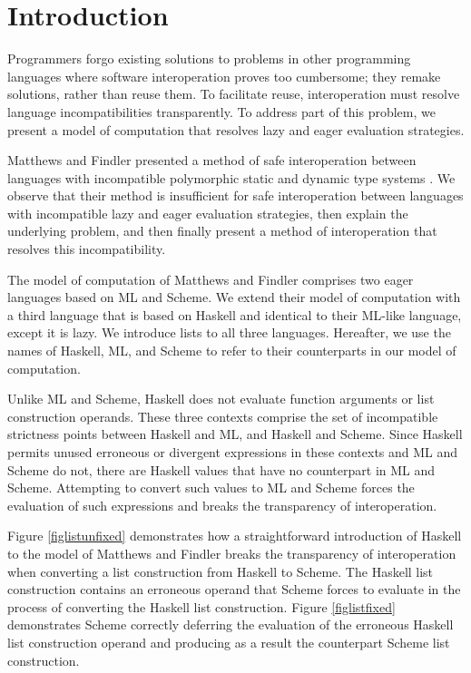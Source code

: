 \section{Introduction}

Programmers forgo existing solutions to problems in other programming languages where software interoperation proves too cumbersome; they remake solutions, rather than reuse them. To facilitate reuse, interoperation must resolve language incompatibilities transparently. To address part of this problem, we present a model of computation that resolves lazy and eager evaluation strategies.

Matthews and Findler presented a method of safe interoperation between languages with incompatible polymorphic static and dynamic type systems \cite{matthews07}. We observe that their method is insufficient for safe interoperation between languages with incompatible lazy and eager evaluation strategies, then explain the underlying problem, and then finally present a method of interoperation that resolves this incompatibility.

The model of computation of Matthews and Findler comprises two eager languages based on ML and Scheme. We extend their model of computation with a third language that is based on Haskell and identical to their ML-like language, except it is lazy. We introduce lists to all three languages. Hereafter, we use the names of Haskell, ML, and Scheme to refer to their counterparts in our model of computation.

Unlike ML and Scheme, Haskell does not evaluate function arguments or list construction operands. These three contexts comprise the set of incompatible strictness points between Haskell and ML, and Haskell and Scheme. Since Haskell permits unused erroneous or divergent expressions in these contexts and ML and Scheme do not, there are Haskell values that have no counterpart in ML and Scheme. Attempting to convert such values to ML and Scheme forces the evaluation of such expressions and breaks the transparency of interoperation.





Figure \ref{figlistunfixed} demonstrates how a straightforward introduction of Haskell to the model of Matthews and Findler breaks the transparency of interoperation when converting a list construction from Haskell to Scheme. The Haskell list construction contains an erroneous operand that Scheme forces to evaluate in the process of converting the Haskell list construction. Figure \ref{figlistfixed} demonstrates Scheme correctly deferring the evaluation of the erroneous Haskell list construction operand and producing as a result the counterpart Scheme list construction.

